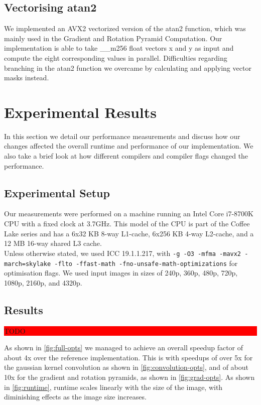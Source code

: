 \documentclass[letterpaper]{article}
\begin{document}
\subsection*{Vectorising atan2}
We implemented an AVX2 vectorized version of the atan2 function, which was mainly used in the Gradient and Rotation Pyramid Computation. Our implementation is able to take \_\_m256 float vectors x and y as input and compute the eight corresponding values in parallel. Difficulties regarding branching in the atan2 function we overcame by calculating and applying vector masks instead.

\section{Experimental Results}\label{sec:results}
In this section we detail our performance measurements and discuss how our changes affected the overall runtime and performance of our implementation. We also take a brief look at how different compilers and compiler flags changed the performance.

\subsection*{Experimental Setup}
Our measurements were performed on a machine running an Intel Core i7-8700K CPU with a fixed clock at 3.7GHz. This model of the CPU is part of the Coffee Lake series and has a 6x32 KB 8-way L1-cache, 6x256 KB 4-way L2-cache, and a 12 MB 16-way shared L3 cache. \\

Unless otherwise stated, we used ICC 19.1.1.217, with \texttt{-g -O3 -mfma -mavx2 -march=skylake -flto -ffast-math -fno-unsafe-math-optimizations} for optimisation flags. We used input images in sizes of 240p, 360p, 480p, 720p, 1080p, 2160p, and 4320p.

\subsection*{Results}
\colorbox{red}{\parbox{0.45\textwidth}{TODO}}
As shown in \autoref{fig:full-opts} we managed to achieve an overall speedup factor of about 4x over the reference implementation. This is with speedups of over 5x for the gaussian kernel convolution as shown in \autoref{fig:convolution-opts}, and of about 10x for the gradient and rotation pyramids, as shown in \autoref{fig:grad-opts}. As shown in \autoref{fig:runtime}, runtime scales linearly with the size of the image, with diminishing effects as the image size increases. \\
\end{document}
